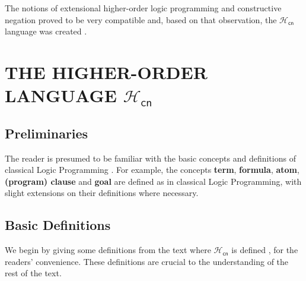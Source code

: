\documentclass[inscr,ack,preface]{dithesis}
\theoremstyle{definition}
\newcommand{\hcn}{$\mathcal{H}_\mathsf{cn}$}
\begin{document}
The notions of extensional higher-order logic programming and constructive negation proved to be very compatible and, based on that observation, the \hcn{} language was created \cite{DBLP:conf/kr/CharalambidisR14}.

\chapter{THE HIGHER-ORDER LANGUAGE \hcn}
\label{chap:hcn}

\section{Preliminaries}
The reader is presumed to be familiar with the basic concepts and definitions of classical Logic Programming \cite{Lloyd:1987:FLP:39279}. For example, the concepts \textbf{term}, \textbf{formula}, \textbf{atom}, \textbf{(program) clause} and \textbf{goal} are defined as in classical Logic Programming, with slight extensions on their definitions where necessary.

\section{Basic Definitions}
We begin by giving some definitions from the text where \hcn{} is defined \cite{DBLP:conf/kr/CharalambidisR14}, for the readers' convenience. These definitions are crucial to the understanding of the rest of the text.
\end{document}
